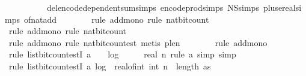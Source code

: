 \begin{isabellebody}
\ \ \ \ \ \ \ \ \ \ del{\isacharcolon}{\kern0pt}encode{\isacharunderscore}{\kern0pt}dependent{\isacharunderscore}{\kern0pt}sum{\isachardot}{\kern0pt}simps\ encode{\isacharunderscore}{\kern0pt}prod{\isachardot}{\kern0pt}simps\ N\isactrlsub S{\isachardot}{\kern0pt}simps\ plus{\isacharunderscore}{\kern0pt}ereal{\isachardot}{\kern0pt}simps\ of{\isacharunderscore}{\kern0pt}nat{\isacharunderscore}{\kern0pt}add{\isacharparenright}{\kern0pt}\isanewline
\ \ \ \ \ \ \isamarkupfalse%
\ {\isacharparenleft}{\kern0pt}rule\ add{\isacharunderscore}{\kern0pt}mono{\isacharcomma}{\kern0pt}\ rule\ nat{\isacharunderscore}{\kern0pt}bit{\isacharunderscore}{\kern0pt}count{\isacharparenright}{\kern0pt}\isanewline
\ \ \ \ \ \ \isamarkupfalse%
\ {\isacharparenleft}{\kern0pt}rule\ add{\isacharunderscore}{\kern0pt}mono{\isacharcomma}{\kern0pt}\ rule\ nat{\isacharunderscore}{\kern0pt}bit{\isacharunderscore}{\kern0pt}count{\isacharparenright}{\kern0pt}\isanewline
\ \ \ \ \ \ \isamarkupfalse%
\ {\isacharparenleft}{\kern0pt}rule\ add{\isacharunderscore}{\kern0pt}mono{\isacharcomma}{\kern0pt}\ rule\ nat{\isacharunderscore}{\kern0pt}bit{\isacharunderscore}{\kern0pt}count{\isacharunderscore}{\kern0pt}est{\isacharcomma}{\kern0pt}\ metis\ p{\isacharunderscore}{\kern0pt}le{\isacharunderscore}{\kern0pt}n{\isacharparenright}{\kern0pt}\isanewline
\ \ \ \ \ \ \isamarkupfalse%
\ {\isacharparenleft}{\kern0pt}rule\ add{\isacharunderscore}{\kern0pt}mono{\isacharparenright}{\kern0pt}\isanewline
\ \ \ \ \ \ \ \isamarkupfalse%
\ {\isacharparenleft}{\kern0pt}rule\ list{\isacharunderscore}{\kern0pt}bit{\isacharunderscore}{\kern0pt}count{\isacharunderscore}{\kern0pt}estI{\isacharbrackleft}{\kern0pt}\ a{\isacharequal}{\kern0pt}{\isachardoublequoteopen}{}\ {\isacharplus}{\kern0pt}\ {}\ {\isacharasterisk}{\kern0pt}\ log\ {}\ {\isacharparenleft}{\kern0pt}{}\ {\isacharplus}{\kern0pt}\ {}\ {\isacharasterisk}{\kern0pt}\ real\ n{\isacharparenright}{\kern0pt}{\isachardoublequoteclose}{\isacharbrackright}{\kern0pt}{\isacharcomma}{\kern0pt}\ rule\ a{\isacharunderscore}{\kern0pt}{}{\isacharcomma}{\kern0pt}\ simp{\isacharcomma}{\kern0pt}\ simp{\isacharparenright}{\kern0pt}\isanewline
\ \ \ \ \ \ \isamarkupfalse%
\ {\isacharparenleft}{\kern0pt}rule\ list{\isacharunderscore}{\kern0pt}bit{\isacharunderscore}{\kern0pt}count{\isacharunderscore}{\kern0pt}estI{\isacharbrackleft}{\kern0pt}\ a{\isacharequal}{\kern0pt}{\isachardoublequoteopen}{}{\isacharasterisk}{\kern0pt}\ log\ {}\ {\isacharparenleft}{\kern0pt}real{\isacharunderscore}{\kern0pt}of{\isacharunderscore}{\kern0pt}int\ {\isacharparenleft}{\kern0pt}int\ {\isacharparenleft}{\kern0pt}{\isacharparenleft}{\kern0pt}{}{\isacharplus}{\kern0pt}{}{\isacharasterisk}{\kern0pt}n{\isacharparenright}{\kern0pt}\ {\isacharasterisk}{\kern0pt}\ length\ as{\isacharparenright}{\kern0pt}{\isacharplus}{\kern0pt}{}{\isacharparenright}{\kern0pt}{\isacharparenright}{\kern0pt}{\isacharplus}{\kern0pt}{}{\isachardoublequoteclose}{\isacharbrackright}{\kern0pt}{\isacharparenright}{\kern0pt}\isanewline

\end{isabellebody}
